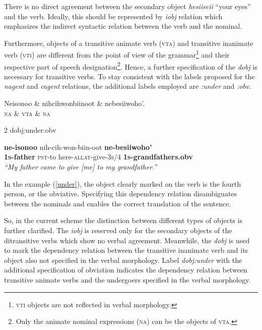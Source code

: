 \documentclass[11pt]{article}
\begin{document}
\normalsize
There is no direct agreement between the secondary object \textit{hesiiseii} ``your eyes'' and the verb. Ideally, this should be represented by \textit{iobj} relation which emphasizes the indirect syntactic relation between the verb and the nominal. 

Furthermore, objects of a transitive animate verb (\textsc{vta}) and transitive inanimate verb (\textsc{vti}) are different from the point of view of the grammar\footnote{\textsc{vti} objects are not reflected in verbal morphology.} and their respective part of speech designation\footnote{Only the animate nominal expressions (\textsc{na}) can be the objects of \textsc{vta}.}. Hence, a further specification of the \textit{dobj} is necessary for transitive verbs. To stay consistent with the labels proposed for the \textit{nagent} and \textit{cagent} relations, the additional labels employed are \textit{:under} and \textit{:obv}.

\small
\begin{exe}
\ex \label{under}
\begin{dependency}
\begin{deptext}
Neisonoo \& nihcihwonbiinoot \& nebesiiwoho'.\\
\textsc{na} \& \textsc{vta}	\& \textsc{na}\\
\end{deptext}
	{2}	{dobj:under:obv}
\end{dependency}
\gll \textbf{ne-isonoo} {nih-cih-won-biin-oot} \textbf{ne-besiiwoho'} \\
\textbf{\textsc{1s}-father} {\textsc{pst}-to here-\textsc{allat}-give-\textsc{3s/4}} \textbf{\textsc{1s}-grandfathers.obv}\\
\trans \textit{``My father came to give [me] to my grandfather.''}
\end{exe}
\normalsize
In the example (\ref{under}), the object clearly marked on the verb is the fourth person, or the obviative. Specifying this dependency relation disambiguates between the nominals and enables the correct translation of the sentence.

So, in the current scheme the distinction between different types of objects is further clarified. The \textit{iobj} is reserved only for the secondary objects of the ditransitive verbs which show no verbal agreement. Meanwhile, the \textit{dobj} is used to mark the dependency relation between the transitive inanimate verb and its object also not specified in the verbal morphology. Label \textit{dobj:under} with the additional specification of obviation indicates the dependency relation between transitive animate verbs and the undergoers specified in the verbal morphology. 
\end{document}
